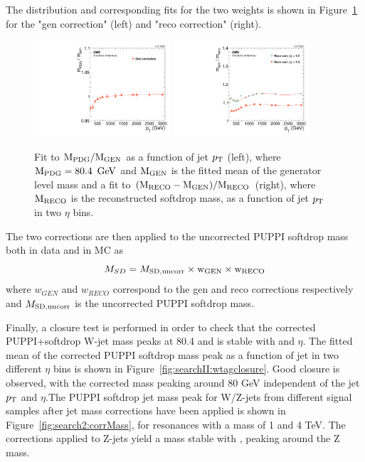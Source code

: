 The distribution and corresponding fits for the two weights is shown in Figure~\ref{fig:jmcfits} for the "gen correction" (left) and "reco correction" (right).
\begin{figure}[h!]
\centering
\includegraphics[width=0.45\textwidth]{figures/analysis/search2/AN-16-235/plots/JMC_fit_gen.pdf}
\includegraphics[width=0.45\textwidth]{figures/analysis/search2/AN-16-235/plots/JMC_fit_reco.pdf}
\caption{Fit to $\rm{M_{PDG}/M_{GEN}}$ as a function of jet $p_{\mathrm{T}}$ (left), where $\rm{M_{PDG}}=80.4~\,\text{Ge\hspace{-.08em}V}$ and $\rm{M_{GEN}}$ is the fitted mean of the generator level mass and a fit to $\rm{(M_{RECO}-M_{GEN})/M_{RECO}}$ (right), where $\rm{M_{RECO}}$ is the reconstructed softdrop mass, as a function of jet $p_{\mathrm{T}}$ in two $\eta$ bins.}
\label{fig:jmcfits}
\end{figure}
The two corrections are then applied to the uncorrected PUPPI softdrop mass both in data and in MC as
\begin{equation}
M_{SD}=M_{\rm{SD, uncorr}} \times \rm{w_{GEN}} \times \rm{w_{RECO}}
\end{equation}
where $w_{GEN}$ and $w_{RECO}$ correspond to the gen and reco corrections respectively and $M_{\rm{SD, uncorr}}$ is the uncorrected PUPPI softdrop mass. \par
Finally, a closure test is performed in order to check that the corrected PUPPI+softdrop W-jet mass peaks at 80.4 \GeV and is stable with \PT and $\eta$. The fitted mean of the corrected PUPPI softdrop mass peak as a function of jet \PT in two different $\eta$ bins is shown in Figure~\ref{fig:searchII:wtagclosure}. Good closure is observed, with the corrected mass peaking around 80 GeV independent of the jet $p_{\mathrm{T}}$ and $\eta$.The PUPPI softdrop jet mass peak for W/Z-jets from different signal samples after jet mass corrections have been applied is shown in Figure~\ref{fig:search2:corrMass}, for resonances with a mass of 1 and 4 TeV. The corrections applied to Z-jets yield a mass stable with \PT, peaking around the Z mass. 
